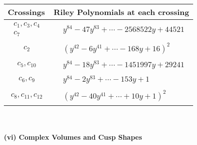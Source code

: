 \documentclass[1p]{elsarticle_modified}
\theoremstyle{definition}
\begin{document}
\begin{tabular}{m{50pt}|m{274pt}}
Crossings & \hspace{64pt}Riley Polynomials at each crossing \\
\hline $$\begin{aligned}c_{1},c_{3},c_{4}\\c_{7}\end{aligned}$$&$\begin{aligned}
&y^{84}-47 y^{83}+\cdots-2568522 y+44521
\end{aligned}$\\
\hline $$\begin{aligned}c_{2}\end{aligned}$$&$\begin{aligned}
&(y^{42}-6 y^{41}+\cdots-168 y+16)^{2}
\end{aligned}$\\
\hline $$\begin{aligned}c_{5},c_{10}\end{aligned}$$&$\begin{aligned}
&y^{84}-18 y^{83}+\cdots-1451997 y+29241
\end{aligned}$\\
\hline $$\begin{aligned}c_{6},c_{9}\end{aligned}$$&$\begin{aligned}
&y^{84}-2 y^{83}+\cdots-153 y+1
\end{aligned}$\\
\hline $$\begin{aligned}c_{8},c_{11},c_{12}\end{aligned}$$&$\begin{aligned}
&(y^{42}-40 y^{41}+\cdots+10 y+1)^{2}
\end{aligned}$\\
\hline
\end{tabular}\\~\\
\newpage\flushleft \textbf{(vi) Complex Volumes and Cusp Shapes}
\end{document}

